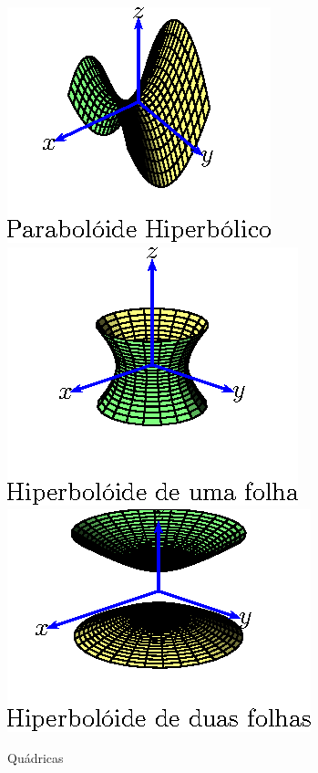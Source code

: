 \begin{figure}[htp]
\includegraphics{cap_superficies/figs/figura_5}
\includegraphics{cap_superficies/figs/figura_6}
\includegraphics{cap_superficies/figs/figura_7} \caption{\label{quadricas}Quádricas}
\end{figure}

